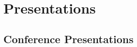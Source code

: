 
\section[Presentations]{Presentations \hfill \normalsize{\scheduled} \footnotesize{\textcolor{itemcat}{}}}


\subsection{Conference Presentations}
